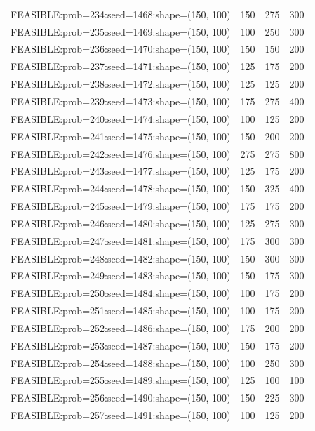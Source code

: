 \begin{longtable}{lccc}
FEASIBLE:prob=234:seed=1468:shape=(150, 100) &  150 &   275 &    300 \\
FEASIBLE:prob=235:seed=1469:shape=(150, 100) &  100 &   250 &    300 \\
FEASIBLE:prob=236:seed=1470:shape=(150, 100) &  150 &   150 &    200 \\
FEASIBLE:prob=237:seed=1471:shape=(150, 100) &  125 &   175 &    200 \\
FEASIBLE:prob=238:seed=1472:shape=(150, 100) &  125 &   125 &    200 \\
FEASIBLE:prob=239:seed=1473:shape=(150, 100) &  175 &   275 &    400 \\
FEASIBLE:prob=240:seed=1474:shape=(150, 100) &  100 &   125 &    200 \\
FEASIBLE:prob=241:seed=1475:shape=(150, 100) &  150 &   200 &    200 \\
FEASIBLE:prob=242:seed=1476:shape=(150, 100) &  275 &   275 &    800 \\
FEASIBLE:prob=243:seed=1477:shape=(150, 100) &  125 &   175 &    200 \\
FEASIBLE:prob=244:seed=1478:shape=(150, 100) &  150 &   325 &    400 \\
FEASIBLE:prob=245:seed=1479:shape=(150, 100) &  175 &   175 &    200 \\
FEASIBLE:prob=246:seed=1480:shape=(150, 100) &  125 &   275 &    300 \\
FEASIBLE:prob=247:seed=1481:shape=(150, 100) &  175 &   300 &    300 \\
FEASIBLE:prob=248:seed=1482:shape=(150, 100) &  150 &   300 &    300 \\
FEASIBLE:prob=249:seed=1483:shape=(150, 100) &  150 &   175 &    300 \\
FEASIBLE:prob=250:seed=1484:shape=(150, 100) &  100 &   175 &    200 \\
FEASIBLE:prob=251:seed=1485:shape=(150, 100) &  100 &   175 &    200 \\
FEASIBLE:prob=252:seed=1486:shape=(150, 100) &  175 &   200 &    200 \\
FEASIBLE:prob=253:seed=1487:shape=(150, 100) &  150 &   175 &    200 \\
FEASIBLE:prob=254:seed=1488:shape=(150, 100) &  100 &   250 &    300 \\
FEASIBLE:prob=255:seed=1489:shape=(150, 100) &  125 &   100 &    100 \\
FEASIBLE:prob=256:seed=1490:shape=(150, 100) &  150 &   225 &    300 \\
FEASIBLE:prob=257:seed=1491:shape=(150, 100) &  100 &   125 &    200 \\

\end{longtable}
